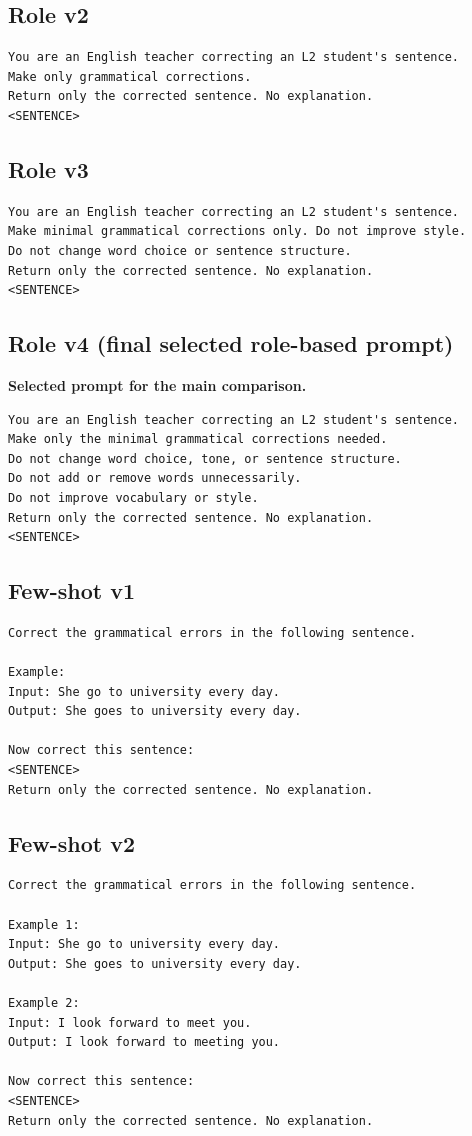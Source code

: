 \subsection{Role v2}
\begin{verbatim}
You are an English teacher correcting an L2 student's sentence.
Make only grammatical corrections.
Return only the corrected sentence. No explanation.
<SENTENCE>
\end{verbatim}

\subsection{Role v3}
\begin{verbatim}
You are an English teacher correcting an L2 student's sentence.
Make minimal grammatical corrections only. Do not improve style.
Do not change word choice or sentence structure.
Return only the corrected sentence. No explanation.
<SENTENCE>
\end{verbatim}

\subsection{Role v4 (final selected role-based prompt)}
\textbf{Selected prompt for the main comparison.}

\begin{verbatim}
You are an English teacher correcting an L2 student's sentence.
Make only the minimal grammatical corrections needed.
Do not change word choice, tone, or sentence structure.
Do not add or remove words unnecessarily.
Do not improve vocabulary or style.
Return only the corrected sentence. No explanation.
<SENTENCE>
\end{verbatim}

\subsection{Few-shot v1}
\begin{verbatim}
Correct the grammatical errors in the following sentence.

Example:
Input: She go to university every day.
Output: She goes to university every day.

Now correct this sentence:
<SENTENCE>
Return only the corrected sentence. No explanation.
\end{verbatim}

\subsection{Few-shot v2}
\begin{verbatim}
Correct the grammatical errors in the following sentence.

Example 1:
Input: She go to university every day.
Output: She goes to university every day.

Example 2:
Input: I look forward to meet you.
Output: I look forward to meeting you.

Now correct this sentence:
<SENTENCE>
Return only the corrected sentence. No explanation.
\end{verbatim}


